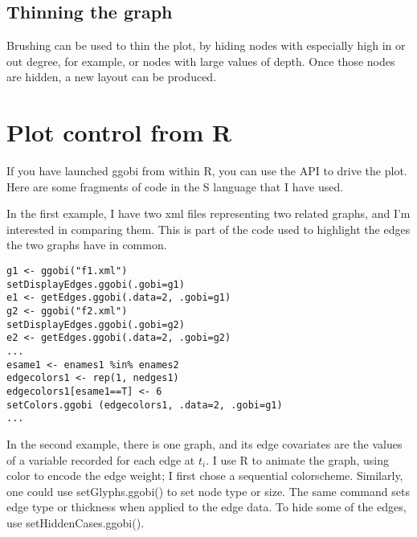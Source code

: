 \documentclass[11pt]{article}
\begin{document}

\subsection{Thinning the graph}

Brushing can be used to thin the plot, by hiding nodes with especially
high in or out degree, for example, or nodes with large values of depth.
Once those nodes are hidden, a new layout can be produced.

\section{Plot control from R}

If you have launched ggobi from within R, you can use the API to
drive the plot.  Here are some fragments of code in the S language
that I have used.

In the first example, I have two xml files representing two
related graphs, and I'm interested in comparing them.  This is
part of the code used to highlight the edges the two graphs
have in common.

\begin{verbatim}
g1 <- ggobi("f1.xml")
setDisplayEdges.ggobi(.gobi=g1)
e1 <- getEdges.ggobi(.data=2, .gobi=g1)
g2 <- ggobi("f2.xml")
setDisplayEdges.ggobi(.gobi=g2)
e2 <- getEdges.ggobi(.data=2, .gobi=g2)
...
esame1 <- enames1 %in% enames2
edgecolors1 <- rep(1, nedges1)
edgecolors1[esame1==T] <- 6
setColors.ggobi (edgecolors1, .data=2, .gobi=g1)
...
\end{verbatim}


In the second example, there is one graph, and its edge covariates are
the values of a variable recorded for each edge at $t_i$.  I use R to
animate the graph, using color to encode the edge weight; I first chose
a sequential colorscheme.  Similarly, one could use setGlyphs.ggobi() to
set node type or size.  The same command sets edge type or thickness
when applied to the edge data.  To hide some of the edges, use
setHiddenCases.ggobi().
\end{document}
